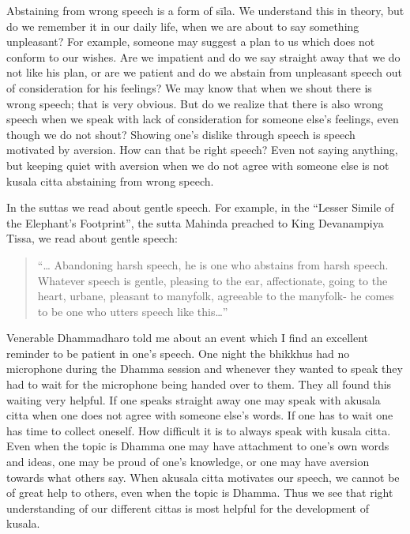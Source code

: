 Abstaining from wrong speech is a form of sīla. We understand this in
theory, but do we remember it in our daily life, when we are about to
say something unpleasant? For example, someone may suggest a plan to us
which does not conform to our wishes. Are we impatient and do we say
straight away that we do not like his plan, or are we patient and do we
abstain from unpleasant speech out of consideration for his feelings? We
may know that when we shout there is wrong speech; that is very obvious.
But do we realize that there is also wrong speech when we speak with
lack of consideration for someone else's feelings, even though we do not
shout? Showing one's dislike through speech is speech motivated by
aversion. How can that be right speech? Even not saying anything, but
keeping quiet with aversion when we do not agree with someone else is
not kusala citta abstaining from wrong speech.

In the suttas we read about gentle speech. For example, in the ``Lesser
Simile of the Elephant's Footprint'', the sutta Mahinda preached to King
Devanampiya Tissa, we read about gentle speech:

\begin{quote}
``\ldots{} Abandoning harsh speech, he is one who abstains from harsh
speech. Whatever speech is gentle, pleasing to the ear, affectionate,
going to the heart, urbane, pleasant to manyfolk, agreeable to the
manyfolk- he comes to be one who utters speech like this\ldots{}''
\end{quote}

Venerable Dhammadharo told me about an event which I find an excellent
reminder to be patient in one's speech. One night the bhikkhus had no
microphone during the Dhamma session and whenever they wanted to speak
they had to wait for the microphone being handed over to them. They all
found this waiting very helpful. If one speaks straight away one may
speak with akusala citta when one does not agree with someone else's
words. If one has to wait one has time to collect oneself. How difficult
it is to always speak with kusala citta. Even when the topic is Dhamma
one may have attachment to one's own words and ideas, one may be proud
of one's knowledge, or one may have aversion towards what others say.
When akusala citta motivates our speech, we cannot be of great help to
others, even when the topic is Dhamma. Thus we see that right
understanding of our different cittas is most helpful for the
development of kusala.



\chapter[Tranquil Meditation]{}
